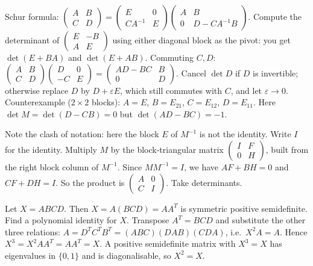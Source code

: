\documentclass[11pt,a4paper]{article}
\begin{document}

Schur formula: \(\begin{pmatrix}A&B\\C&D\end{pmatrix}=\begin{pmatrix}E&0\\CA^{-1}&E\end{pmatrix}\begin{pmatrix}A&B\\0&D-CA^{-1}B\end{pmatrix}\). Compute the determinant of \(\begin{pmatrix}E&-B\\A&E\end{pmatrix}\) using either diagonal block as the pivot: you get \(\det(E+BA)\) and \(\det(E+AB)\).
Commuting \(C,D\): \(\begin{pmatrix}A&B\\C&D\end{pmatrix}\begin{pmatrix}D&0\\-C&E\end{pmatrix}=\begin{pmatrix}AD-BC&B\\0&D\end{pmatrix}\). Cancel \(\det D\) if \(D\) is invertible; otherwise replace \(D\) by \(D+\varepsilon E\), which still commutes with \(C\), and let \(\varepsilon\to0\).
Counterexample (\(2\times2\) blocks): \(A=E\), \(B=E_{21}\), \(C=E_{12}\), \(D=E_{11}\). Here \(\det M=\det(D-CB)=0\) but \(\det(AD-BC)=-1\).

Note the clash of notation: here the block \(E\) of \(M^{-1}\) is not the identity. Write \(I\) for the identity. Multiply \(M\) by the block-triangular matrix \(\begin{pmatrix}I&F\\0&H\end{pmatrix}\), built from the right block column of \(M^{-1}\).
Since \(MM^{-1}=I\), we have \(AF+BH=0\) and \(CF+DH=I\). So the product is \(\begin{pmatrix}A&0\\C&I\end{pmatrix}\). Take determinants.

Let \(X=ABCD\). Then \(X=A(BCD)=AA^T\) is symmetric positive semidefinite. Find a polynomial identity for \(X\).
Transpose \(A^T=BCD\) and substitute the other three relations: \(A=D^TC^TB^T=(ABC)(DAB)(CDA)\), i.e.\ \(X^2A=A\).
Hence \(X^3=X^2AA^T=AA^T=X\). A positive semidefinite matrix with \(X^3=X\) has eigenvalues in \(\{0,1\}\) and is diagonalisable, so \(X^2=X\).
\end{document}
